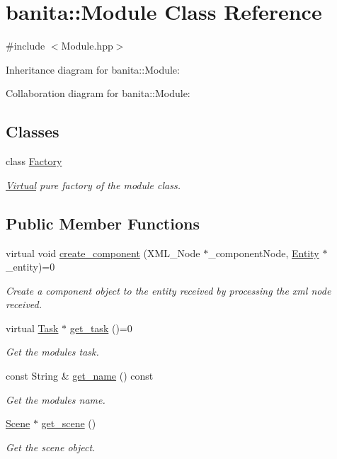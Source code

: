 \hypertarget{classbanita_1_1_module}{}\section{banita\+::Module Class Reference}
\label{classbanita_1_1_module}


{\ttfamily \#include $<$Module.\+hpp$>$}



Inheritance diagram for banita\+::Module\+:


Collaboration diagram for banita\+::Module\+:
\subsection*{Classes}
\begin{DoxyCompactItemize}
\item 
class \mbox{\hyperlink{classbanita_1_1_module_1_1_factory}{Factory}}
\begin{DoxyCompactList}\small\item\em \mbox{\hyperlink{class_virtual}{Virtual}} pure factory of the module class. \end{DoxyCompactList}\end{DoxyCompactItemize}
\subsection*{Public Member Functions}
\begin{DoxyCompactItemize}
\item 
virtual void \mbox{\hyperlink{classbanita_1_1_module_ace6d7ce15d60044f233d30a43dc961dd}{create\+\_\+component}} (X\+M\+L\+\_\+\+Node $\ast$\+\_\+component\+Node, \mbox{\hyperlink{classbanita_1_1_entity}{Entity}} $\ast$\+\_\+entity)=0
\begin{DoxyCompactList}\small\item\em Create a component object to the entity received by processing the xml node received. \end{DoxyCompactList}\item 
virtual \mbox{\hyperlink{classbanita_1_1_task}{Task}} $\ast$ \mbox{\hyperlink{classbanita_1_1_module_a8e29c0b6d7e11a39dac3c0879ef513d9}{get\+\_\+task}} ()=0
\begin{DoxyCompactList}\small\item\em Get the module\textquotesingle{}s task. \end{DoxyCompactList}\item 
const String \& \mbox{\hyperlink{classbanita_1_1_module_a9a17fbfe0d05359427f2e9cbf956852c}{get\+\_\+name}} () const
\begin{DoxyCompactList}\small\item\em Get the module\textquotesingle{}s name. \end{DoxyCompactList}\item 
\mbox{\hyperlink{classbanita_1_1_scene}{Scene}} $\ast$ \mbox{\hyperlink{classbanita_1_1_module_aa2f74f6ba86841383c427199a03b0f9a}{get\+\_\+scene}} ()
\begin{DoxyCompactList}\small\item\em Get the scene object. \end{DoxyCompactList}\end{DoxyCompactItemize}
